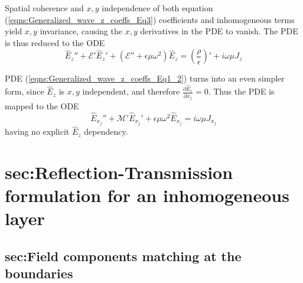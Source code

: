 \documentclass[twocolumn,secnumarabic,amssymb, nobibnotes, aps, prd]{revtex4-1}
\begin{document}
Spatial coherence and $x,y$ independence of both equation (\ref{eqns:Generalized_wave_z_coeffs_Eq3}) coefficients and inhomogeneous terms yield $x,y$ invariance, causing the $x,y$ derivatives in the PDE  to vanish. The PDE is thus reduced to the ODE
\begin{equation}
\hat{E}_z'' + \mathcal{E}' \hat{E}_z' + \left( \mathcal{E}'' + \epsilon \mu \omega^2 \right)\hat{E}_z   = \left( \frac{\rho}{\epsilon}\right)' + i \omega \mu J_z
\label{eqns:ODE_z_inhom}
\end{equation}

PDE (\ref{eqns:Generalized_wave_z_coeffs_Eq1_2})  turns into an even simpler form, since $\hat{E}_z$ is $x,y$ independent, and therefore  $\frac{\partial \hat{E}_z}{\partial {x_j}}=0$. Thus the  PDE is mapped to the ODE  
\begin{equation}
 \hat{E}_{x_j}''+\mathcal{M}' \hat{E}_{x_j}'  +\epsilon \mu \omega^2 \hat{E}_{x_j} = i \omega\mu J_{x_j}
\label{eqns:ODE_xy_inhom}
\end{equation}
having no explicit $\hat{E}_z$ dependency.

\section{sec:Reflection-Transmission formulation for an inhomogeneous layer}
 

\subsection{sec:Field components matching at the boundaries}
\end{document}
